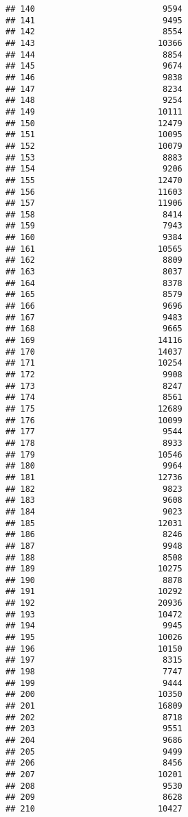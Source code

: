 \documentclass[
]{article}
\begin{document}
\begin{verbatim}
## 140                          9594
## 141                          9495
## 142                          8554
## 143                         10366
## 144                          8854
## 145                          9674
## 146                          9838
## 147                          8234
## 148                          9254
## 149                         10111
## 150                         12479
## 151                         10095
## 152                         10079
## 153                          8883
## 154                          9206
## 155                         12470
## 156                         11603
## 157                         11906
## 158                          8414
## 159                          7943
## 160                          9384
## 161                         10565
## 162                          8809
## 163                          8037
## 164                          8378
## 165                          8579
## 166                          9696
## 167                          9483
## 168                          9665
## 169                         14116
## 170                         14037
## 171                         10254
## 172                          9908
## 173                          8247
## 174                          8561
## 175                         12689
## 176                         10099
## 177                          9544
## 178                          8933
## 179                         10546
## 180                          9964
## 181                         12736
## 182                          9823
## 183                          9608
## 184                          9023
## 185                         12031
## 186                          8246
## 187                          9948
## 188                          8508
## 189                         10275
## 190                          8878
## 191                         10292
## 192                         20936
## 193                         10472
## 194                          9945
## 195                         10026
## 196                         10150
## 197                          8315
## 198                          7747
## 199                          9444
## 200                         10350
## 201                         16809
## 202                          8718
## 203                          9551
## 204                          9686
## 205                          9499
## 206                          8456
## 207                         10201
## 208                          9530
## 209                          8628
## 210                         10427

\end{verbatim}
\end{document}
